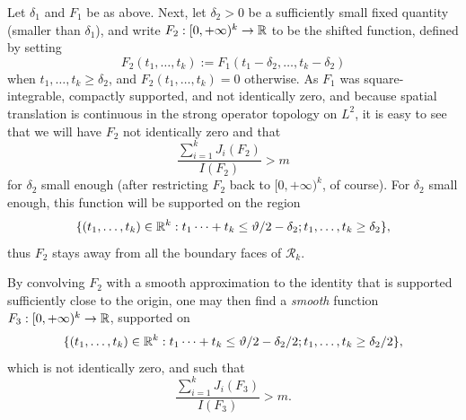 Let $\delta_1$ and $F_1$ be as above. Next, let $\delta_2 > 0$ be a sufficiently small fixed quantity (smaller than $\delta_1$), and write $F_2: [0,+\infty)^k \to \mathbb{R}$ to be the shifted function, defined by setting
$$ F_2(t_1,\dots,t_k) := F_1( t_1-\delta_2, \dots, t_k-\delta_2 )$$
when $t_1,\dots,t_k \geq \delta_2$, and $F_2(t_1,\dots,t_k)=0$ otherwise.
As $F_1$ was square-integrable, compactly supported, and not identically zero, and because spatial translation is continuous in the strong operator topology on $L^2$, it is easy to see that we will have $F_2$ not identically zero and that
\begin{equation}\label{jbig-3}
 \frac{\sum_{i=1}^k J_i(F_2)}{I(F_2)} > m
\end{equation}
for $\delta_2$ small enough (after restricting $F_2$ back to $[0,+\infty)^k$, of course).  For $\delta_2$ small enough, this function will be supported on the region
$$
\{ (t_1,\dots,t_k) \in \mathbb{R}^k: t_1 \dots + t_k \leq \vartheta/2-\delta_2; t_1,\dots,t_k \geq \delta_2 \},$$
thus $F_2$ stays away from all the boundary faces of ${\mathcal R}_k$.

By convolving $F_2$ with a smooth approximation to the identity that is supported sufficiently close to the origin, one may then find a \emph{smooth} function $F_3: [0,+\infty)^k \to \mathbb{R}$, supported on
$$
\{ (t_1,\dots,t_k) \in \mathbb{R}^k: t_1 \dots + t_k \leq \vartheta/2-\delta_2/2; t_1,\dots,t_k \geq \delta_2/2 \},$$
which is not identically zero, and such that
\begin{equation}\label{jbig-4}
 \frac{\sum_{i=1}^k J_i(F_3)}{I(F_3)} > m.
\end{equation}

